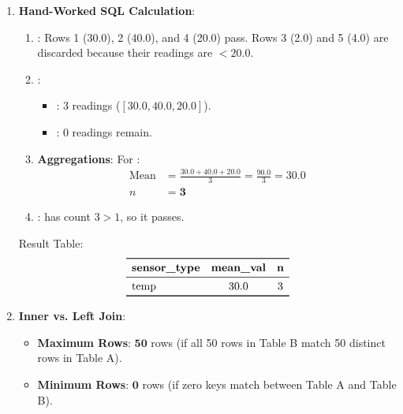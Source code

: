 \begin{enumerate}
    \item \textbf{Hand-Worked SQL Calculation}:
    \begin{enumerate}
        \item \textbf{}: Rows 1 (30.0), 2 (40.0), and 4 (20.0) pass. Rows 3 (2.0) and 5 (4.0) are discarded because their readings are $< 20.0$.
        \item \textbf{}:
        \begin{itemize}
            \item {}: 3 readings ($[30.0, 40.0, 20.0]$).
            \item {}: 0 readings remain.
        \end{itemize}
        \item \textbf{Aggregations}: For :
        \begin{align*}
        \text{Mean} &= \frac{30.0 + 40.0 + 20.0}{3} = \frac{90.0}{3} = \mathbf{30.0} \\
        n &= \mathbf{3}
        \end{align*}
        \item \textbf{}:  has count $3 > 1$, so it passes.
    \end{enumerate}
    Result Table:
    \begin{equation*}
    \begin{array}{lcc}
    \toprule
    \textbf{sensor\_type} & \textbf{mean\_val} & \textbf{n} \\
    \midrule
    \text{temp} & 30.0 & 3 \\
    \bottomrule
    \end{array}
    \end{equation*}

    \item \textbf{Inner vs. Left Join}:
    \begin{itemize}
        \item \textbf{Maximum Rows}: $\mathbf{50}$ rows (if all 50 rows in Table B match 50 distinct rows in Table A).
        \item \textbf{Minimum Rows}: $\mathbf{0}$ rows (if zero keys match between Table A and Table B).
    \end{itemize}
\end{enumerate}